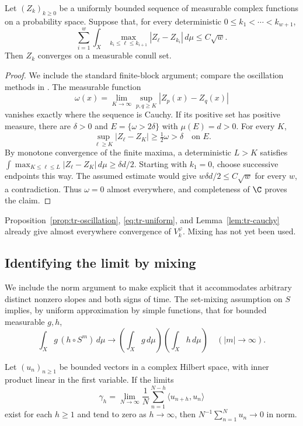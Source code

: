 \begin{lemma}
\label{lem:tr-cauchy}
Let \((Z_k)_{k\geq0}\) be a uniformly bounded sequence of measurable
complex functions on a probability space.  Suppose that, for every
deterministic \(0\leq k_1<\cdots<k_{w+1}\),
\[
 \sum_{i=1}^w\int_X
  \max_{k_i\leq\ell\leq k_{i+1}}|Z_\ell-Z_{k_i}|\,d\mu
 \leq C\sqrt w.
\]
Then \(Z_k\) converges on a measurable conull set.
\end{lemma}

\begin{proof}
We include the standard finite-block argument; compare the oscillation
methods in \cite{Bourgain,JKRW}.
The measurable function
\[
 \omega(x)=\lim_{K\to\infty}\sup_{p,q\geq K}|Z_p(x)-Z_q(x)|
\]
vanishes exactly where the sequence is Cauchy.  If its positive set
has positive measure, there are \(\delta>0\) and
\(E=\{\omega>2\delta\}\) with \(\mu(E)=d>0\).  For every \(K\),
\[
 \sup_{\ell\geq K}|Z_\ell-Z_K|
 \geq\tfrac12\omega>\delta\quad\text{on }E.
\]
By monotone convergence of the finite maxima, a deterministic
\(L>K\) satisfies
\(\int\max_{K\leq\ell\leq L}|Z_\ell-Z_K|\,d\mu\geq\delta d/2\).
Starting with \(k_1=0\), choose successive endpoints this way.
The assumed estimate would give \(w\delta d/2\leq C\sqrt w\)
for every \(w\), a contradiction.  Thus \(\omega=0\) almost
everywhere, and completeness of \(\C\) proves the claim.
\end{proof}

Proposition~\ref{prop:tr-oscillation}, \eqref{eq:tr-uniform}, and
Lemma~\ref{lem:tr-cauchy} already give almost everywhere convergence
of \(V_k^\varphi\).  Mixing has not yet been used.

\subsection{Identifying the limit by mixing}

We include the norm argument to make explicit that it accommodates
arbitrary distinct nonzero slopes and both signs of time.
The set-mixing assumption on \(S\) implies, by uniform approximation
by simple functions, that for bounded measurable \(g,h\),
\begin{equation}
 \int_Xg\,(h\circ S^m)\,d\mu
 \longrightarrow\left(\int_Xg\,d\mu\right)
                 \left(\int_Xh\,d\mu\right)
 \quad(|m|\to\infty).
 \label{eq:tr-functional-mixing}
\end{equation}

\begin{lemma}
\label{lem:tr-vdc}
Let \((u_n)_{n\geq1}\) be bounded vectors in a complex Hilbert space,
with inner product linear in the first variable.  If the limits
\[
 \gamma_h=\lim_{N\to\infty}\frac1N
            \sum_{n=1}^{N-h}\langle u_{n+h},u_n\rangle
\]
exist for each \(h\geq1\) and tend to zero as \(h\to\infty\), then
\(N^{-1}\sum_{n=1}^Nu_n\to0\) in norm.
\end{lemma}

